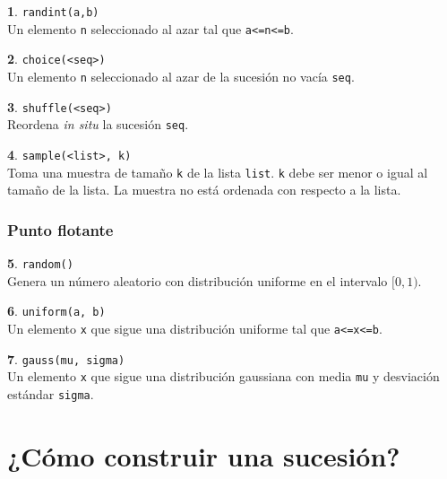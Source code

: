 \documentclass[12pt]{article}
\theoremstyle{definition}
\newtheorem{funcion}{}[section]
\begin{document}
\begin{funcion}
  \verb|randint(a,b)| \\[1ex]
  Un elemento \verb|n| seleccionado al azar tal que \verb|a<=n<=b|.
\end{funcion}

\begin{funcion}
  \verb|choice(<seq>)| \\[1ex]
  Un elemento \verb|n| seleccionado al azar de la sucesión no vacía \verb|seq|.
\end{funcion}

\begin{funcion}
  \verb|shuffle(<seq>)| \\[1ex]
  Reordena \emph{in situ} la sucesión \verb|seq|.
\end{funcion}

\begin{funcion}
  \verb|sample(<list>, k)| \\[1ex]
  Toma una muestra de tamaño \verb|k| de la lista \verb|list|. \verb|k| debe ser menor o igual al tamaño de la lista. La muestra no está ordenada con respecto a la lista.
\end{funcion}

\subsubsection{Punto flotante}

\begin{funcion}
  \verb|random()| \\[1ex]
  Genera un número aleatorio con distribución uniforme en el intervalo $[0, 1)$.
\end{funcion}

\begin{funcion}
  \verb|uniform(a, b)| \\[1ex]
  Un elemento \verb|x| que sigue una distribución uniforme tal que \verb|a<=x<=b|.
\end{funcion}

\begin{funcion}
  \verb|gauss(mu, sigma)| \\[1ex]
  Un elemento \verb|x| que sigue una distribución gaussiana con media \verb|mu| y desviación estándar \verb|sigma|.
\end{funcion}


\section{¿Cómo construir una sucesión?}
\end{document}
